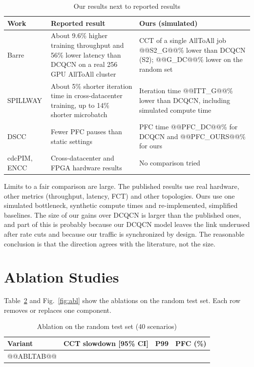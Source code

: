 \documentclass[conference]{IEEEtran}
\begin{document}
\begin{table}[t]
\centering
\caption{Our results next to reported results}
\label{tab:comp}
\scriptsize
\begin{tabular}{p{1.3cm}p{3.2cm}p{2.7cm}}
\toprule
\textbf{Work} & \textbf{Reported result} & \textbf{Ours (simulated)} \\
\midrule
Barre & About 9.6\% higher training throughput and 56\% lower latency than DCQCN on a real 256 GPU AllToAll cluster & CCT of a single AllToAll job @@S2_G@@\% lower than DCQCN (S2); @@G_DC@@\% lower on the random set \\
SPILLWAY & About 5\% shorter iteration time in cross-datacenter training, up to 14\% shorter microbatch & Iteration time @@ITT_G@@\% lower than DCQCN, including simulated compute time \\
DSCC & Fewer PFC pauses than static settings & PFC time @@PFC_DC@@\% for DCQCN and @@PFC_OURS@@\% for ours \\
cdcPIM, ENCC & Cross-datacenter and FPGA hardware results & No comparison tried \\
\bottomrule
\end{tabular}
\end{table}

Limits to a fair comparison are large. The published results use real hardware, other metrics (throughput, latency, FCT) and other topologies. Ours use one simulated bottleneck, synthetic compute times and re-implemented, simplified baselines. The size of our gains over DCQCN is larger than the published ones, and part of this is probably because our DCQCN model leaves the link underused after rate cuts and because our traffic is synchronized by design. The reasonable conclusion is that the direction agrees with the literature, not the size.

\section{Ablation Studies}
Table~\ref{tab:abl} and Fig.~\ref{fig:abl} show the ablations on the random test set. Each row removes or replaces one component.

\begin{table}[t]
\centering
\caption{Ablation on the random test set (40 scenarios)}
\label{tab:abl}
\scriptsize
\begin{tabular}{p{3.3cm}ccc}
\toprule
\textbf{Variant} & \textbf{CCT slowdown [95\% CI]} & \textbf{P99} & \textbf{PFC (\%)} \\
\midrule
@@ABLTAB@@
\bottomrule
\end{tabular}
\end{table}
\end{document}
